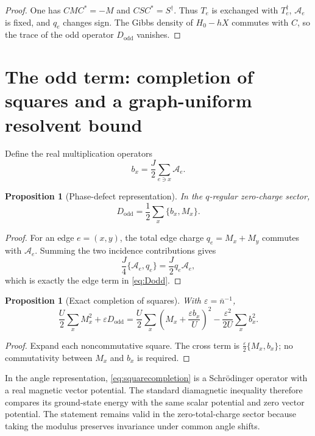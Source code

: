 \documentclass[11pt]{article}
\newtheorem{proposition}[theorem]{Proposition}
\newcommand{\nbar}{\bar n}
\newcommand{\cA}{\mathcal A}
\begin{document}
\begin{proof}
One has $CMC^*=-M$ and $CSC^*=S^\dagger$. Thus $T_e$ is exchanged with $T_e^\dagger$, $\cA_e$ is fixed, and $q_e$ changes sign. The Gibbs density of $H_0-hX$ commutes with $C$, so the trace of the odd operator $D_{\mathrm{odd}}$ vanishes.
\end{proof}

\section{The odd term: completion of squares and a graph-uniform resolvent bound}

Define the real multiplication operators
\begin{equation}
b_x=\frac J2\sum_{e\ni x}\cA_e.
\label{eq:bx}
\end{equation}

\begin{proposition}[Phase-defect representation]
In the $q$-regular zero-charge sector,
\begin{equation}
D_{\mathrm{odd}}=\frac12\sum_x\{b_x,M_x\}.
\label{eq:anticomm}
\end{equation}
\end{proposition}

\begin{proof}
For an edge $e=(x,y)$, the total edge charge $q_e=M_x+M_y$ commutes with $\cA_e$. Summing the two incidence contributions gives
\[
\frac J4\{\cA_e,q_e\}=\frac J2q_e\cA_e,
\]
which is exactly the edge term in \eqref{eq:Dodd}.
\end{proof}

\begin{proposition}[Exact completion of squares]
With $\varepsilon=\nbar^{-1}$,
\begin{equation}
\frac U2\sum_xM_x^2+\varepsilon D_{\mathrm{odd}}
=\frac U2\sum_x\left(M_x+\frac{\varepsilon b_x}{U}\right)^2
-\frac{\varepsilon^2}{2U}\sum_xb_x^2.
\label{eq:squarecompletion}
\end{equation}
\end{proposition}

\begin{proof}
Expand each noncommutative square. The cross term is $\frac\varepsilon2\{M_x,b_x\}$; no commutativity between $M_x$ and $b_x$ is required.
\end{proof}

In the angle representation, \eqref{eq:squarecompletion} is a Schr\"odinger operator with a real magnetic vector potential. The standard diamagnetic inequality therefore compares its ground-state energy with the same scalar potential and zero vector potential. The statement remains valid in the zero-total-charge sector because taking the modulus preserves invariance under common angle shifts.
\end{document}
